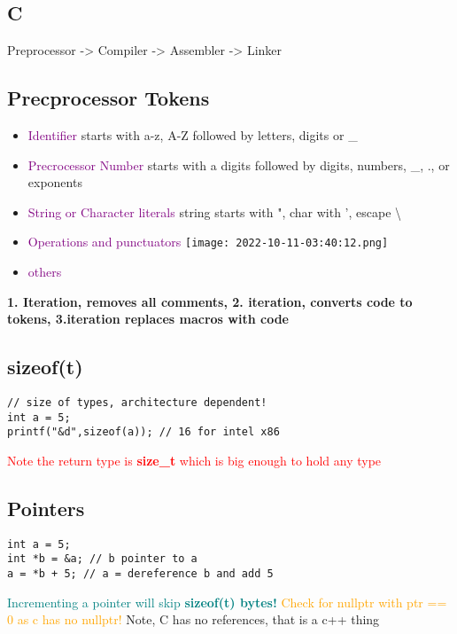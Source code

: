 \documentclass[main.tex,fontsize=8pt,paper=a4,paper=landscape,DIV=calc,]{scrartcl}
\begin{document}
\begin{multicols*}{4}
\lstset{
    language=c,
    style=code,
}
\section{C}
Preprocessor -> Compiler -> Assembler -> Linker

\subsection{Precprocessor Tokens}
\begin{itemize}
\item \textcolor{purple}{Identifier}\newline
starts with a-z, A-Z followed by letters, digits or \_
\item \textcolor{purple}{Precrocessor Number}\newline
  starts with a digits followed by digits, numbers, \_, ., or exponents
\item \textcolor{purple}{String or Character literals}\newline
  string starts with ", char with ', escape \textbackslash 
\item \textcolor{purple}{Operations and punctuators}\newline
  \texttt{[image: 2022-10-11-03:40:12.png]}
\item \textcolor{purple}{others}
\end{itemize} 

\textbf{1. Iteration, removes all comments, 2. iteration, converts code to tokens, 3.iteration replaces macros with code}

\subsection{sizeof(t)}
\begin{lstlisting}
// size of types, architecture dependent!
int a = 5;
printf("&d",sizeof(a)); // 16 for intel x86
\end{lstlisting}
\vspace{2mm}
\textcolor{red}{Note the return type is \textbf{size\_t} which is big enough to hold any type}

\subsection{Pointers}
\begin{lstlisting}
int a = 5;
int *b = &a; // b pointer to a 
a = *b + 5; // a = dereference b and add 5
\end{lstlisting}
\vspace{2mm}
\textcolor{teal}{Incrementing a pointer will skip \textbf{sizeof(t) bytes!}}
\textcolor{orange}{Check for nullptr with ptr == 0 as c has no nullptr!}
Note, C has no references, that is a c++ thing


\end{multicols*}
\end{document}

